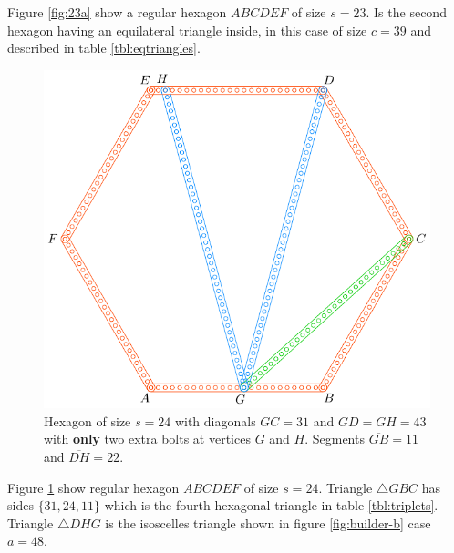 \documentclass[11pt]{article}
\begin{document}
Figure \ref{fig:23a} show a regular hexagon $ABCDEF$ of size $s=23$. Is the second hexagon having an equilateral triangle inside, in this case of size $c=39$ and described in table \ref{tbl:eqtriangles}.

\begin{figure}[H]
\centering
\includegraphics[scale=0.9]{24/hexa-24a}
\caption{Hexagon of size $s = 24$ with diagonals $\overline{GC} = 31$ and $\overline{GD} = \overline{GH} = 43$ with \textbf{only} two extra bolts at vertices $G$ and $H$. Segments $\overline{GB} = 11$ and $\overline{DH} = 22$.}
\label{fig:24a}
\end{figure}

Figure \ref{fig:24a} show regular hexagon $ABCDEF$ of size $s = 24$. Triangle $\triangle{GBC}$ has sides $\{31,24,11\}$ which is the fourth hexagonal triangle in table \ref{tbl:triplets}. Triangle $\triangle{DHG}$ is the isoscelles triangle shown in figure \ref{fig:builder-b} case $a=48$.
\end{document}
